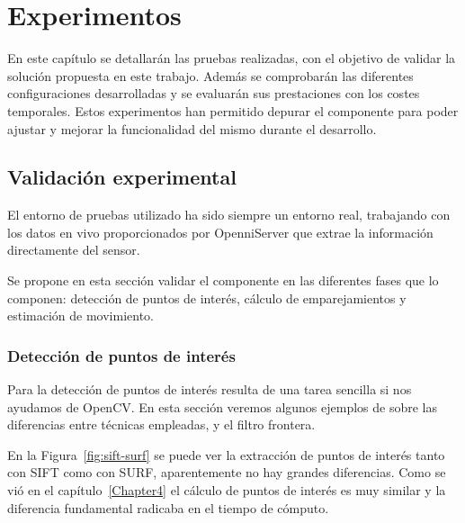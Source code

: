 
\chapter{Experimentos}

\label{Chapter5} %

En este capítulo se detallarán las pruebas realizadas, con el objetivo de validar la solución propuesta en este trabajo. Además se comprobarán las diferentes configuraciones desarrolladas y se evaluarán sus prestaciones con los costes temporales. Estos experimentos han permitido depurar el componente para poder ajustar y mejorar la funcionalidad del mismo durante el desarrollo.

\section{Validación experimental}

El entorno de pruebas utilizado ha sido siempre un entorno real, trabajando con los datos en vivo proporcionados por OpenniServer que extrae la información directamente del sensor.

Se propone en esta sección validar el componente en las diferentes fases que lo componen: detección de puntos de interés, cálculo de emparejamientos y estimación de movimiento.

\subsection{Detección de puntos de interés}

Para la detección de puntos de interés resulta de una tarea sencilla si nos ayudamos de OpenCV. En esta sección veremos algunos ejemplos de sobre las diferencias entre técnicas empleadas, y el filtro frontera.

En la Figura~\ref{fig:sift-surf} se puede ver la extracción de puntos de interés tanto con SIFT como con SURF, aparentemente no hay grandes diferencias. Como se vió en el capítulo~\ref{Chapter4} el cálculo de puntos de interés es muy similar y la diferencia fundamental radicaba en el tiempo de cómputo.

